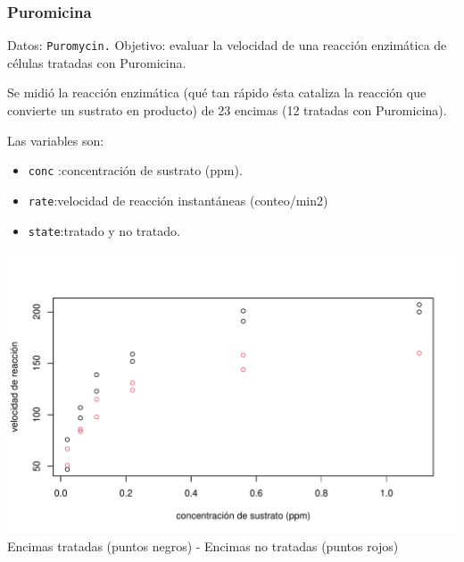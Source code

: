 \documentclass[
]{article}
\newenvironment{Shaded}{\begin{snugshade}}{\end{snugshade}}
\newcommand{\AttributeTok}[1]{\textcolor[rgb]{0.77,0.63,0.00}{#1}}
\newcommand{\FunctionTok}[1]{\textcolor[rgb]{0.00,0.00,0.00}{#1}}
\newcommand{\NormalTok}[1]{#1}
\newcommand{\SpecialCharTok}[1]{\textcolor[rgb]{0.00,0.00,0.00}{#1}}
\newcommand{\StringTok}[1]{\textcolor[rgb]{0.31,0.60,0.02}{#1}}
\providecommand{\tightlist}{%
  \setlength{\itemsep}{0pt}\setlength{\parskip}{0pt}}
\begin{document}
\hypertarget{puromicina}{%
\subsubsection{Puromicina}\label{puromicina}}

Datos: \texttt{Puromycin.}
Objetivo: evaluar la velocidad de una reacción enzimática de células
tratadas con Puromicina.

Se midió la reacción enzimática (qué tan rápido ésta cataliza la reacción que
convierte un sustrato en producto) de 23 encimas (12 tratadas con Puromicina).

Las variables son:

\begin{itemize}
\tightlist
\item
  \texttt{conc} :concentración de sustrato (ppm).
\item
  \texttt{rate}:velocidad de reacción instantáneas (conteo/min2)
\item
  \texttt{state}:tratado y no tratado.
\end{itemize}

\begin{Shaded}
\end{Shaded}

\includegraphics{MLG2_files/figure-latex/plotpurom-1.pdf}
Encimas tratadas (puntos negros) - Encimas no tratadas (puntos rojos)
\end{document}
